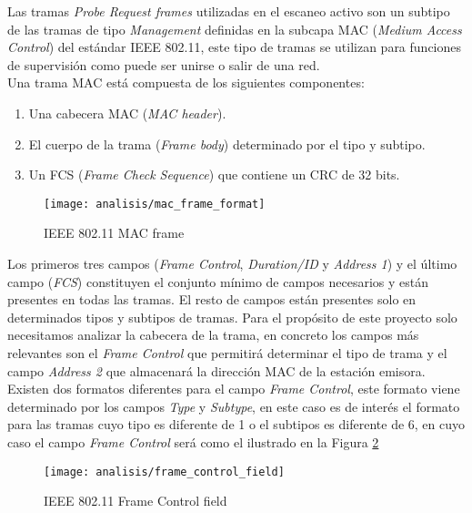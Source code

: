 \documentclass[../proyecto.tex]{subfiles}
\begin{document}
Las tramas \textit{Probe Request frames} utilizadas en el escaneo activo son un subtipo de las tramas de tipo \textit{Management} definidas en la subcapa MAC (\textit{Medium Access Control}) del estándar IEEE 802.11, este tipo de tramas se utilizan para funciones de supervisión como puede ser unirse o salir de una red.\\

Una trama MAC está compuesta de los siguientes componentes:
\begin{enumerate}
  \item Una cabecera MAC (\textit{MAC header}).
  \item El cuerpo de la trama (\textit{Frame body}) determinado por el tipo y subtipo.
  \item Un FCS (\textit{Frame Check Sequence}) que contiene un CRC de 32 bits.
\end{enumerate}

\begin{figure}[H]
\centering
\texttt{[image: analisis/mac\_frame\_format]}
\caption{IEEE 802.11 MAC frame}
\label{fig:ieee80211_mac_frame}
\end{figure}

Los primeros tres campos (\textit{Frame Control}, \textit{Duration/ID} y \textit{Address 1}) y el último campo (\textit{FCS}) constituyen el conjunto mínimo de campos necesarios y están presentes en todas las tramas. El resto de campos están presentes solo en determinados tipos y subtipos de tramas. Para el propósito de este proyecto solo necesitamos analizar la cabecera de la trama, en concreto los campos más relevantes son el \textit{Frame Control} que permitirá determinar el tipo de trama y el campo \textit{Address 2} que almacenará la dirección MAC de la estación emisora.\\

Existen dos formatos diferentes para el campo \textit{Frame Control}, este formato viene determinado por los campos \textit{Type} y \textit{Subtype}, en este caso es de interés el formato para las tramas cuyo tipo es diferente de 1 o el subtipos es diferente de 6, en cuyo caso el campo \textit{Frame Control} será como el ilustrado en la Figura \ref{fig:ieee80211_frame_control_field}

\begin{figure}[H]
\centering
\texttt{[image: analisis/frame\_control\_field]}
\caption{IEEE 802.11 Frame Control field}
\label{fig:ieee80211_frame_control_field}
\end{figure}
\end{document}
